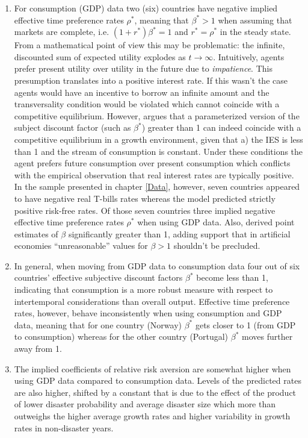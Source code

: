 {\begin{enumerate}
    \item For consumption (GDP) data two (six) countries have negative implied effective time preference rates $\rho^{*}$, meaning that $\beta^{*} > 1$ when assuming that markets are complete, i.e. $(1+r^{*})\beta^{*} = 1$ and $r^{*} = \rho^{*}$ in the steady state. From a mathematical point of view this may be problematic: the infinite, discounted sum of expected utility explodes as $t \longrightarrow \infty$. Intuitively, agents prefer present utility over utility in the future due to \textit{impatience}. This presumption translates into a positive interest rate. If this wasn't the case agents would have an incentive to borrow an infinite amount and the transversality condition would be violated which cannot coincide with a competitive equilibrium. However, \citet{Kocherlakota1990} argues that a parameterized version of the subject discount factor (such as $\beta^{*}$) greater than 1 can indeed coincide with a competitive equilibrium in a growth environment, given that a) the IES is less than 1 and the stream of consumption is constant. Under these conditions the agent prefers future consumption over present consumption which conflicts with the empirical observation that real interest rates are typically positive. In the sample presented in chapter \ref{Data}, however, seven countries appeared to have negative real T-bills rates whereas the model predicted strictly positive risk-free rates. Of those seven countries three implied negative effective time preference rates $\rho^{*}$ when using GDP data. Also, \citet{Hansen1982} derived point estimates of $\beta$ significantly greater than 1, adding support that in artificial economies ``unreasonable'' \cite{Kocherlakota1990} values for $\beta > 1$ shouldn't be precluded.
    \item In general, when moving from GDP data to consumption data four out of six countries' effective subjective discount factors $\beta^{*}$ become less than 1, indicating that consumption is a more robust measure with respect to intertemporal considerations than overall output. Effective time preference rates, however, behave inconsistently when using consumption and GDP data, meaning that for one country (Norway) $\beta^{*}$ gets closer to 1 (from GDP to consumption) whereas for the other country (Portugal) $\beta^{*}$ moves further away from 1. 
    \item The implied coefficients of relative risk aversion are somewhat higher when using GDP data compared to consumption data. Levels of the predicted rates are also higher, shifted by a constant that is due to the effect of the product of lower disaster probability and average disaster size which more than outweighs the higher average growth rates and higher variability in growth rates in non-disaster years.
\end{enumerate}

}
